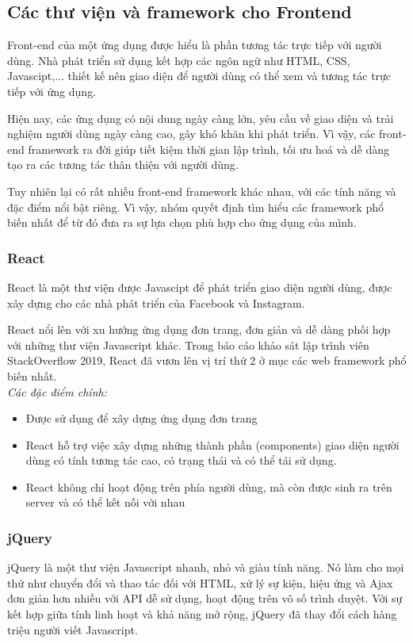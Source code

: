 \subsection{Các thư viện và framework cho Frontend}
Front-end của một ứng dụng được hiểu là phần tương tác trực tiếp với người dùng. Nhà phát triển sử dụng kết hợp các ngôn ngữ như HTML, CSS, Javascipt,... thiết kế nên giao diện để người dùng có thể xem và tương tác trực tiếp với ứng dụng.

Hiện nay, các ứng dụng có nội dung ngày càng lớn, yêu cầu về giao diện và trải nghiệm người dùng ngày càng cao, gây khó khăn khi phát triển. Vì vậy, các front-end framework ra đời giúp tiết kiệm thời gian lập trình, tối ưu hoá và dễ dàng tạo ra các tương tác thân thiện với người dùng.

Tuy nhiên lại có rất nhiều front-end framework khác nhau, với các tính năng và đặc điểm nổi bật riêng. Vì vậy, nhóm quyết định tìm hiểu các framework phổ biến nhất để từ đó đưa ra sự lựa chọn phù hợp cho ứng dụng của mình.
\subsubsection{React}
React là một thư viện được Javascipt để phát triển giao diện người dùng, được xây dựng cho các nhà phát triển của Facebook và Instagram.

React nổi lên với xu hướng ứng dụng đơn trang, đơn giản và dễ dàng phối hợp với những thư viện Javascript khác. Trong báo cáo khảo sát lập trình viên StackOverflow 2019, React đã vươn lên vị trí thứ 2 ở mục các web framework phổ biến nhất.\\

\textit{Các đặc điểm chính:}
\begin {itemize}
\item Được sử dụng để xây dựng ứng dụng đơn trang
\item React hỗ trợ việc xây dựng những thành phần (components) giao diện người dùng có tính tương tác cao, có trạng thái và có thể tái sử dụng.
\item React không chỉ hoạt động trên phía người dùng, mà còn được sinh ra trên server và có thể kết nối với nhau
\end {itemize}

\subsubsection{jQuery}
jQuery là một thư viện Javascript nhanh, nhỏ và giàu tính năng. Nó làm cho mọi thứ như chuyển đổi và thao tác đối với HTML, xử lý sự kiện, hiệu ứng và Ajax đơn giản hơn nhiều với API dễ sử dụng, hoạt động trên vô số trình duyệt. Với sự kết hợp giữa tính linh hoạt và khả năng mở rộng, jQuery đã thay đổi cách hàng triệu người viết Javascript.\\

